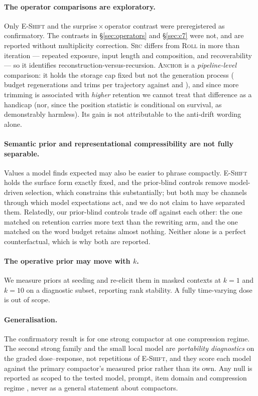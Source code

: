\paragraph{The operator comparisons are exploratory.} Only \textsc{E-Shift} and the
surprise\,$\times$\,operator contrast were preregistered as confirmatory. The contrasts in
\S\ref{sec:operators} and \S\ref{sec:c7} were not, and are reported without multiplicity
correction. \textsc{Src} differs from \textsc{Roll} in more than iteration --- repeated exposure,
input length and composition, and recoverability --- so it identifies reconstruction-versus-recursion.
\textsc{Anchor} is a \emph{pipeline-level} comparison: it holds the storage cap fixed but not the
generation process (\RetriesOfive{} budget regenerations and \TrimsOfive{} trims per trajectory
against \RetriesOone{} and \TrimsOone{}), and since more trimming is associated with \emph{higher}
retention we cannot treat that difference as a handicap (nor, since the position statistic is
conditional on survival, as demonstrably harmless). Its gain is not attributable to the
anti-drift wording alone.

\paragraph{Semantic prior and representational compressibility are not fully separable.} Values a
model finds expected may also be easier to phrase compactly. \textsc{E-Shift} holds the surface form
exactly fixed, and the prior-blind controls remove model-driven selection, which constrains this
substantially; but both may be channels through which model expectations act, and we do not claim to
have separated them. Relatedly, our prior-blind controls trade off against each other: the one matched
on retention carries more text than the rewriting arm, and the one matched on the word budget retains
almost nothing. Neither alone is a perfect counterfactual, which is why both are reported.

\paragraph{The operative prior may move with $k$.} We measure priors at seeding and re-elicit them in
masked contexts at $k{=}1$ and $k{=}10$ on a diagnostic subset, reporting rank stability. A fully
time-varying dose is out of scope.

\paragraph{Generalisation.} The confirmatory result is for one strong compactor at one compression
regime. The second strong family and the small local model are \emph{portability diagnostics} on the
graded dose--response, not repetitions of \textsc{E-Shift}, and they score each model against the
primary compactor's measured prior rather than its own. Any null is reported as scoped to the tested
model, prompt, item domain and compression regime \citep{lakens2017equivalence}, never as a general
statement about compactors.

